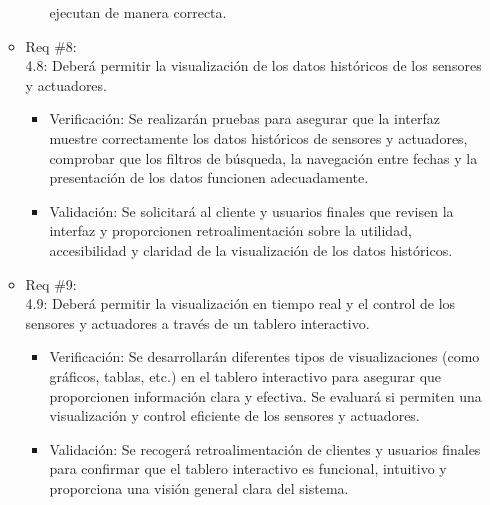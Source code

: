 \begin{itemize}
\begin{itemize}
\begin{itemize}
			                  ejecutan de manera correcta.
		            \end{itemize}
		      \item Req \#8: \\ 4.8: Deberá permitir la visualización de los datos históricos de
		            los sensores y actuadores.
		            \begin{itemize}
			            \item Verificación: Se realizarán pruebas para asegurar que la interfaz muestre
			                  correctamente los datos históricos de sensores y actuadores, comprobar que los
			                  filtros de búsqueda, la navegación entre fechas y la presentación de los datos
			                  funcionen adecuadamente.
			            \item Validación: Se solicitará al cliente y usuarios finales que revisen la interfaz
			                  y proporcionen retroalimentación sobre la utilidad, accesibilidad y claridad de
			                  la visualización de los datos históricos.
		            \end{itemize}
		      \item Req \#9: \\ 4.9: Deberá permitir la visualización en tiempo real y el control
		            de los sensores y actuadores a través de un tablero interactivo.
		            \begin{itemize}
			            \item Verificación: Se desarrollarán diferentes tipos de visualizaciones (como
			                  gráficos, tablas, etc.) en el tablero interactivo para asegurar que
			                  proporcionen información clara y efectiva. Se evaluará si permiten una
			                  visualización y control eficiente de los sensores y actuadores.
			            \item Validación: Se recogerá retroalimentación de clientes y usuarios finales para
			                  confirmar que el tablero interactivo es funcional, intuitivo y proporciona una
			                  visión general clara del sistema.
		            \end{itemize}
	      \end{itemize}


\end{itemize}
